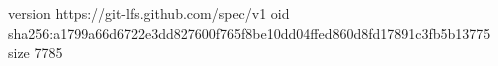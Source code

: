 version https://git-lfs.github.com/spec/v1
oid sha256:a1799a66d6722e3dd827600f765f8be10dd04ffed860d8fd17891c3fb5b13775
size 7785
